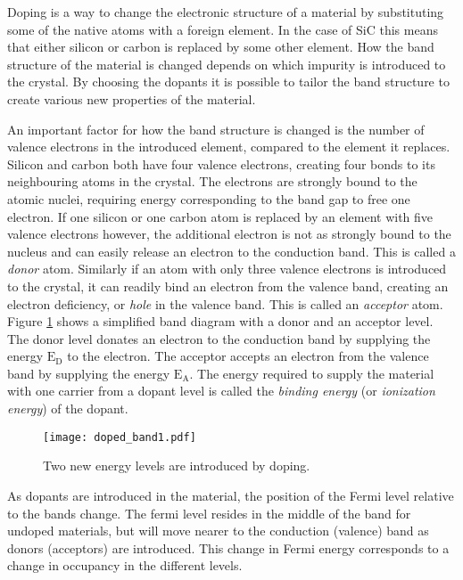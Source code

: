 

Doping is a way to change the electronic structure of a material by substituting some of the native atoms with a foreign element. In the case of SiC this means that either silicon or carbon is replaced by some other element. How the band structure of the material is changed depends on which impurity is introduced to the crystal. By choosing the dopants it is possible to tailor the band structure to create various new properties of the material. 

An important factor for how the band structure is changed is the number of valence electrons in the introduced element, compared to the element it replaces. Silicon and carbon both have four valence electrons, creating four bonds to its neighbouring atoms in the crystal. The electrons are strongly bound to the atomic nuclei, requiring energy corresponding to the band gap to free one electron. If one silicon or one carbon atom is replaced by an element with five valence electrons however, the additional electron is not as strongly bound to the nucleus and can easily release an electron to the conduction band. This is called a \emph{donor} atom. Similarly if an atom with only three valence electrons is introduced to the crystal, it can readily bind an electron from the valence band, creating an electron deficiency, or \emph{hole} in the valence band. This is called an \emph{acceptor} atom. Figure \ref{fig:dopant_band} shows a simplified band diagram with a donor and an acceptor level. The donor level donates an electron to the conduction band by supplying the energy $\mathrm{E_D}$ to the electron. The acceptor accepts an electron from the valence band by supplying the energy $\mathrm{E_A}$. The energy required to supply the material with one carrier from a dopant level is called the \emph{binding energy} (or \emph{ionization energy}) of the dopant. 

\begin{figure}[h]
\begin{center}
\texttt{[image: doped\_band1.pdf]}
\caption{Two new energy levels are introduced by doping. 
\label{fig:dopant_band}}
\end{center}
\end{figure}

As dopants are introduced in the material, the position of the Fermi level relative to the bands change. The fermi level resides in the middle of the band for undoped materials, but will move nearer to the conduction (valence) band as donors (acceptors) are introduced. This change in Fermi energy corresponds to a change in occupancy in the different levels. 

